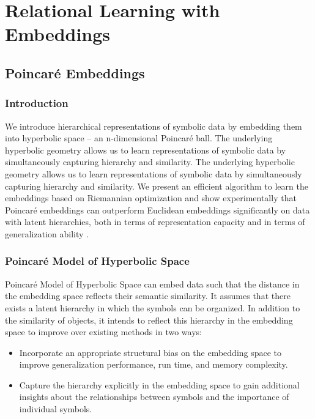 \chapter{Relational Learning with Embeddings}

\section{Poincaré Embeddings}


\subsection{Introduction}
We introduce hierarchical representations of symbolic data by embedding them into hyperbolic space – an n-dimensional Poincaré ball. The underlying hyperbolic geometry allows us to learn representations of symbolic data by simultaneously capturing hierarchy and similarity\cite{NIPS2017_7213}. The underlying hyperbolic geometry allows us to learn representations of symbolic data by simultaneously capturing hierarchy and similarity. We present an efficient algorithm to learn the embeddings based on Riemannian optimization and show experimentally that Poincaré embeddings can outperform Euclidean embeddings significantly on data with latent hierarchies, both in terms of representation capacity and in terms of generalization ability .

\subsection{Poincaré Model of Hyperbolic Space}

Poincaré Model of Hyperbolic Space can embed data such that the distance in the embedding space reflects their semantic similarity. It assumes that there exists a latent hierarchy in which the symbols can be organized. In addition to the similarity of objects, it intends to reflect this hierarchy in the embedding space to improve over existing methods in two ways:
\begin{itemize}
    \item Incorporate an appropriate structural bias on the embedding space to improve generalization performance, run time, and memory complexity.
    \item Capture the hierarchy explicitly in the embedding space to gain additional insights about the relationships between symbols and the importance of individual symbols.
\end{itemize}

